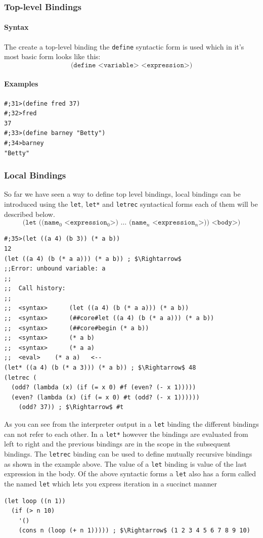 \documentclass[12pt,a4paper,english,twoside]{article}
\begin{document}
\subsubsection{Top-level Bindings}
\paragraph{Syntax}
The create a top-level binding the \texttt{define} syntactic form is used which in it's most basic form looks like this:
\begin{equation*}
\texttt{(define <variable> <expression>)}
\end{equation*}
\paragraph{Examples}
\begin{lstlisting}
#;31>(define fred 37)
#;32>fred
37
#;33>(define barney "Betty")
#;34>barney
"Betty"
\end{lstlisting}
\subsubsection{Local Bindings}
So far we have seen a way to define top level bindings, local bindings can be 
introduced using the \texttt{let}, \texttt{let*} and \texttt{letrec} 
syntactical forms each of them will be described below.
\begin{equation*}
\texttt{(let ((name$_{0}$ <expression$_{0}$>) $\dots$ (name$_{n}$ <expression$_{n}$>)) <body>)}
\end{equation*}
\begin{listing}
\begin{lstlisting}
#;35>(let ((a 4) (b 3)) (* a b))
12
(let ((a 4) (b (* a a))) (* a b)) ; $\Rightarrow$
;;Error: unbound variable: a
;;
;;	Call history:
;;
;;	<syntax>	  (let ((a 4) (b (* a a))) (* a b))
;;	<syntax>	  (##core#let ((a 4) (b (* a a))) (* a b))
;;	<syntax>	  (##core#begin (* a b))
;;	<syntax>	  (* a b)
;;	<syntax>	  (* a a)
;;	<eval>	  (* a a)	<--
(let* ((a 4) (b (* a 3))) (* a b)) ; $\Rightarrow$ 48
(letrec (
  (odd? (lambda (x) (if (= x 0) #f (even? (- x 1))))) 
  (even? (lambda (x) (if (= x 0) #t (odd? (- x 1)))))) 
    (odd? 37)) ; $\Rightarrow$ #t
\end{lstlisting}
\end{listing}
As you can see from the interpreter output in a \texttt{let} binding the 
different bindings can not refer to each other. In a \texttt{let*} however the 
bindings are evaluated from left to right and the previous bindings are in the 
scope in the subsequent bindings. The \texttt{letrec} binding can be used to 
define mutually recursive bindings as shown in the example above. The value 
of a \texttt{let} binding is value of the last expression in the body. Of the above 
syntactic forms a \texttt{let} also has a form called the named \texttt{let} 
which lets you express iteration in a succinct manner
\begin{lstlisting}
(let loop ((n 1))
  (if (> n 10)
    '()
    (cons n (loop (+ n 1))))) ; $\Rightarrow$ (1 2 3 4 5 6 7 8 9 10)
\end{lstlisting}
\end{document}
